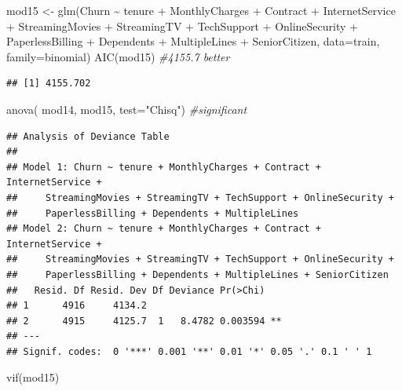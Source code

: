 \documentclass[
  twoside]{article}
\newenvironment{Shaded}{\begin{snugshade}}{\end{snugshade}}
\newcommand{\AttributeTok}[1]{\textcolor[rgb]{0.77,0.63,0.00}{#1}}
\newcommand{\CommentTok}[1]{\textcolor[rgb]{0.56,0.35,0.01}{\textit{#1}}}
\newcommand{\FunctionTok}[1]{\textcolor[rgb]{0.00,0.00,0.00}{#1}}
\newcommand{\NormalTok}[1]{#1}
\newcommand{\OtherTok}[1]{\textcolor[rgb]{0.56,0.35,0.01}{#1}}
\newcommand{\SpecialCharTok}[1]{\textcolor[rgb]{0.00,0.00,0.00}{#1}}
\newcommand{\StringTok}[1]{\textcolor[rgb]{0.31,0.60,0.02}{#1}}
\begin{document}
\begin{Shaded}
\begin{Highlighting}[]
\NormalTok{mod15 }\OtherTok{\textless{}{-}} \FunctionTok{glm}\NormalTok{(Churn }\SpecialCharTok{\textasciitilde{}}\NormalTok{ tenure }\SpecialCharTok{+}\NormalTok{ MonthlyCharges }\SpecialCharTok{+}\NormalTok{ Contract }\SpecialCharTok{+}\NormalTok{ InternetService }\SpecialCharTok{+}
\NormalTok{               StreamingMovies }\SpecialCharTok{+}\NormalTok{ StreamingTV }\SpecialCharTok{+}\NormalTok{ TechSupport }\SpecialCharTok{+}\NormalTok{ OnlineSecurity }\SpecialCharTok{+}
\NormalTok{               PaperlessBilling }\SpecialCharTok{+}\NormalTok{ Dependents }\SpecialCharTok{+}\NormalTok{ MultipleLines }\SpecialCharTok{+}\NormalTok{ SeniorCitizen,}
             \AttributeTok{data=}\NormalTok{train, }\AttributeTok{family=}\NormalTok{binomial)}
\FunctionTok{AIC}\NormalTok{(mod15) }\CommentTok{\#4155.7 better}
\end{Highlighting}
\end{Shaded}

\begin{verbatim}
## [1] 4155.702
\end{verbatim}

\begin{Shaded}
\begin{Highlighting}[]
\FunctionTok{anova}\NormalTok{( mod14, mod15,  }\AttributeTok{test=}\StringTok{"Chisq"}\NormalTok{) }\CommentTok{\#significant}
\end{Highlighting}
\end{Shaded}

\begin{verbatim}
## Analysis of Deviance Table
## 
## Model 1: Churn ~ tenure + MonthlyCharges + Contract + InternetService + 
##     StreamingMovies + StreamingTV + TechSupport + OnlineSecurity + 
##     PaperlessBilling + Dependents + MultipleLines
## Model 2: Churn ~ tenure + MonthlyCharges + Contract + InternetService + 
##     StreamingMovies + StreamingTV + TechSupport + OnlineSecurity + 
##     PaperlessBilling + Dependents + MultipleLines + SeniorCitizen
##   Resid. Df Resid. Dev Df Deviance Pr(>Chi)   
## 1      4916     4134.2                        
## 2      4915     4125.7  1   8.4782 0.003594 **
## ---
## Signif. codes:  0 '***' 0.001 '**' 0.01 '*' 0.05 '.' 0.1 ' ' 1
\end{verbatim}

\begin{Shaded}
\begin{Highlighting}[]
\FunctionTok{vif}\NormalTok{(mod15)}
\end{Highlighting}
\end{Shaded}
\end{document}
